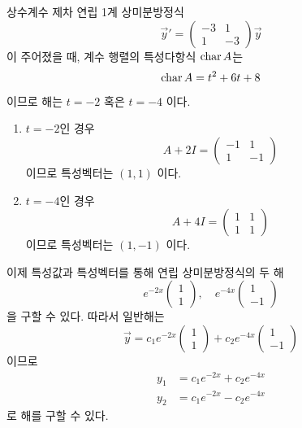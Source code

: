 \documentclass[../engineering_mathematics_lecture_note.tex]{subfiles}
\begin{document}
\begin{example}
    상수계수 제차 연립 1계 상미분방정식
    \begin{equation*}
        \vec y' = \begin{pmatrix}
            -3 & 1 \\
            1 & -3
        \end{pmatrix}
        \vec y
    \end{equation*}
    이 주어졌을 때, 계수 행렬의 특성다항식 $\operatorname{char} A$는
    \begin{equation*}
        \operatorname{char} A = t^2 + 6t + 8
    \end{equation*}
    이므로 해는 $t = -2$ 혹은 $t = -4$ 이다.
    \begin{enumerate}
        \item $t = -2$인 경우
            \begin{equation*}
                A + 2I = \begin{pmatrix}
                    -1 & 1\\
                    1 & -1
                \end{pmatrix}
            \end{equation*}
            이므로 특성벡터는 $(1, 1)$ 이다.
        \item $t = -4$인 경우
            \begin{equation*}
                A + 4I = \begin{pmatrix}
                    1 & 1\\
                    1 & 1
                \end{pmatrix}
            \end{equation*}
            이므로 특성벡터는 $(1, -1)$ 이다.
    \end{enumerate}
    이제 특성값과 특성벡터를 통해 연립 상미분방정식의 두 해
    \begin{equation*}
        e^{-2x} \begin{pmatrix}
            1 \\ 1
        \end{pmatrix}, \quad e^{-4x} \begin{pmatrix}
            1 \\ -1
        \end{pmatrix}
    \end{equation*}
    을 구할 수 있다.
    따라서 일반해는
    \begin{equation*}
        \vec y = c_1 e^{-2x} \begin{pmatrix}
            1 \\ 1
        \end{pmatrix} + c_2 e^{-4x} \begin{pmatrix}
            1 \\ -1
        \end{pmatrix}
    \end{equation*}
    이므로
    \begin{align*}
        y_1 &= c_1 e^{-2x} + c_2 e^{-4x}\\
        y_2 &= c_1 e^{-2x} - c_2 e^{-4x}
    \end{align*}
    로 해를 구할 수 있다.


\end{example}
\end{document}
